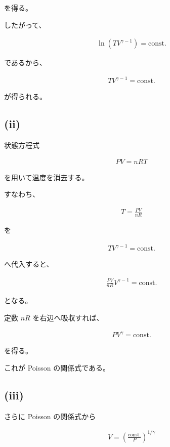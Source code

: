 \documentclass[platex,dvipdfmx,a4paper]{jsarticle}
\begin{document}
を得る。

したがって、

\begin{align*}
\ln \left(TV^{\gamma-1}\right)
=
\mathrm{const.}
\end{align*}

であるから、

\begin{align*}
TV^{\gamma-1}
=
\mathrm{const.}
\end{align*}

が得られる。

\subsection{(ii)}

状態方程式

\begin{align*}
PV=nRT
\end{align*}

を用いて温度を消去する。

すなわち、

\begin{align*}
T=\frac{PV}{nR}
\end{align*}

を

\begin{align*}
TV^{\gamma-1}
=
\mathrm{const.}
\end{align*}

へ代入すると、

\begin{align*}
\frac{PV}{nR}V^{\gamma-1}
=
\mathrm{const.}
\end{align*}

となる。

定数 $nR$ を右辺へ吸収すれば、

\begin{align*}
PV^\gamma
=
\mathrm{const.}
\end{align*}

を得る。

これが Poisson の関係式である。

\subsection{(iii)}

さらに Poisson の関係式から

\begin{align*}
V
=
\left(
\frac{\mathrm{const.}}{P}
\right)^{1/\gamma}
\end{align*}
\end{document}
